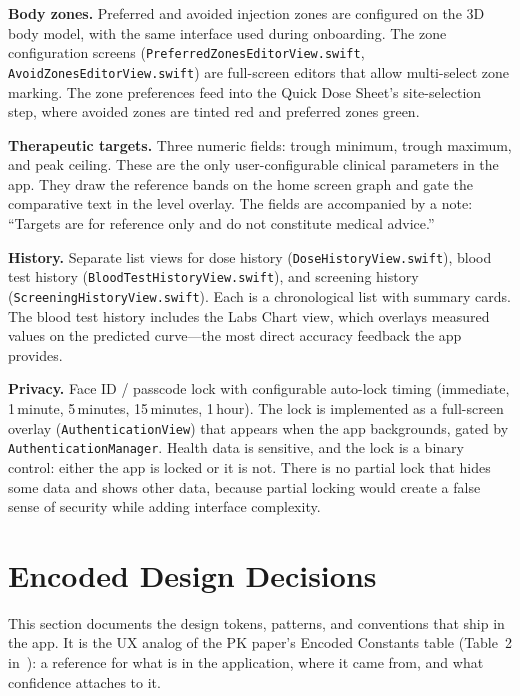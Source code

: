 \documentclass[11pt,a4paper]{article}
\newcommand{\code}[1]{\texttt{\small #1}}
\begin{document}
\textbf{Body zones.} Preferred and avoided injection zones are configured
on the 3D body model, with the same interface used during onboarding. The
zone configuration screens (\code{PreferredZonesEditorView.swift},
\code{AvoidZonesEditorView.swift}) are full-screen editors that allow
multi-select zone marking. The zone preferences feed into the Quick Dose
Sheet's site-selection step, where avoided zones are tinted red and
preferred zones green.

\textbf{Therapeutic targets.} Three numeric fields: trough minimum, trough
maximum, and peak ceiling. These are the only user-configurable clinical
parameters in the app. They draw the reference bands on the home screen
graph and gate the comparative text in the level overlay. The fields are
accompanied by a note: ``Targets are for reference only and do not
constitute medical advice.''

\textbf{History.} Separate list views for dose history
(\code{DoseHistoryView.swift}), blood test history
(\code{BloodTestHistoryView.swift}), and screening history
(\code{ScreeningHistoryView.swift}). Each is a chronological list with
summary cards. The blood test history includes the Labs Chart view,
which overlays measured values on the predicted curve---the most direct
accuracy feedback the app provides.

\textbf{Privacy.} Face ID / passcode lock with configurable auto-lock
timing (immediate, 1\,minute, 5\,minutes, 15\,minutes, 1\,hour). The
lock is implemented as a full-screen overlay (\code{AuthenticationView})
that appears when the app backgrounds, gated by
\code{AuthenticationManager}. Health data is sensitive, and the lock is a
binary control: either the app is locked or it is not. There is no
partial lock that hides some data and shows other data, because partial
locking would create a false sense of security while adding interface
complexity.

\section{Encoded Design Decisions}
\label{sec:encoded}

This section documents the design tokens, patterns, and conventions that
ship in the app. It is the UX analog of the PK paper's Encoded Constants
table (Table~2 in~\cite{xtpk}): a reference for what is in the
application, where it came from, and what confidence attaches to it.
\end{document}
